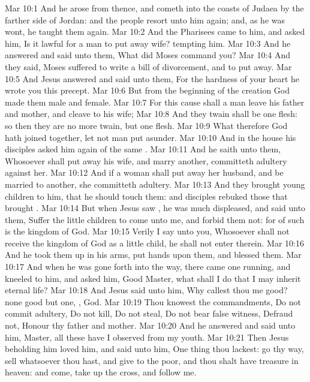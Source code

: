 \vs Mar 10:1 And he arose from thence, and cometh into the coasts of Judaea by the farther side of Jordan: and the people resort unto him again; and, as he was wont, he taught them again.
\vs Mar 10:2 And the Pharisees came to him, and asked him, Is it lawful for a man to put away  wife? tempting him.
\vs Mar 10:3 And he answered and said unto them, What did Moses command you?
\vs Mar 10:4 And they said, Moses suffered to write a bill of divorcement, and to put  away.
\vs Mar 10:5 And Jesus answered and said unto them, For the hardness of your heart he wrote you this precept.
\vs Mar 10:6 But from the beginning of the creation God made them male and female.
\vs Mar 10:7 For this cause shall a man leave his father and mother, and cleave to his wife;
\vs Mar 10:8 And they twain shall be one flesh: so then they are no more twain, but one flesh.
\vs Mar 10:9 What therefore God hath joined together, let not man put asunder.
\vs Mar 10:10 And in the house his disciples asked him again of the same .
\vs Mar 10:11 And he saith unto them, Whosoever shall put away his wife, and marry another, committeth adultery against her.
\vs Mar 10:12 And if a woman shall put away her husband, and be married to another, she committeth adultery.
\vs Mar 10:13 And they brought young children to him, that he should touch them: and  disciples rebuked those that brought .
\vs Mar 10:14 But when Jesus saw , he was much displeased, and said unto them, Suffer the little children to come unto me, and forbid them not: for of such is the kingdom of God.
\vs Mar 10:15 Verily I say unto you, Whosoever shall not receive the kingdom of God as a little child, he shall not enter therein.
\vs Mar 10:16 And he took them up in his arms, put  hands upon them, and blessed them.
\vs Mar 10:17 And when he was gone forth into the way, there came one running, and kneeled to him, and asked him, Good Master, what shall I do that I may inherit eternal life?
\vs Mar 10:18 And Jesus said unto him, Why callest thou me good?  none good but one, , God.
\vs Mar 10:19 Thou knowest the commandments, Do not commit adultery, Do not kill, Do not steal, Do not bear false witness, Defraud not, Honour thy father and mother.
\vs Mar 10:20 And he answered and said unto him, Master, all these have I observed from my youth.
\vs Mar 10:21 Then Jesus beholding him loved him, and said unto him, One thing thou lackest: go thy way, sell whatsoever thou hast, and give to the poor, and thou shalt have treasure in heaven: and come, take up the cross, and follow me.
